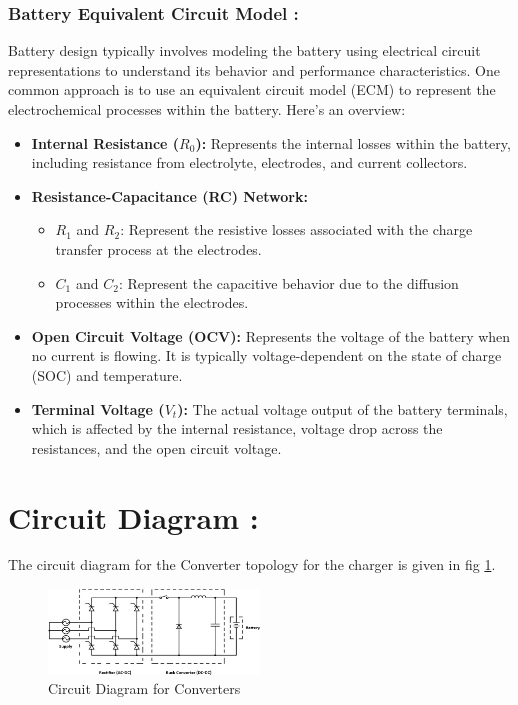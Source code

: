 \documentclass[conference]{IEEEtran}
\begin{document}
\subsubsection{Battery Equivalent Circuit Model :}
Battery design typically involves modeling the battery using electrical circuit representations to understand its behavior and performance characteristics. One common approach is to use an equivalent circuit model (ECM) to represent the electrochemical processes within the battery. Here's an overview:
\begin{itemize}
  \item \textbf{Internal Resistance ($R_0$):} Represents the internal losses within the battery, including resistance from electrolyte, electrodes, and current collectors.
  
  \item \textbf{Resistance-Capacitance (RC) Network:}
  \begin{itemize}
    \item $R_1$ and $R_2$: Represent the resistive losses associated with the charge transfer process at the electrodes.
    \item $C_1$ and $C_2$: Represent the capacitive behavior due to the diffusion processes within the electrodes.
  \end{itemize}
  
  \item \textbf{Open Circuit Voltage (OCV):} Represents the voltage of the battery when no current is flowing. It is typically voltage-dependent on the state of charge (SOC) and temperature.
  
  \item \textbf{Terminal Voltage ($V_t$):} The actual voltage output of the battery terminals, which is affected by the internal resistance, voltage drop across the resistances, and the open circuit voltage.
\end{itemize}


\section{Circuit Diagram :}
\hspace{0.5cm} The circuit diagram for the Converter topology for the charger is given in fig \ref{Circuit Diagram}.
\begin{figure}[htbp]
    \centering
    \includegraphics[width=0.5\textwidth]{images/charger_CD.png}
    \caption{Circuit Diagram for Converters}
    \label{Circuit Diagram}
\end{figure}
\end{document}

